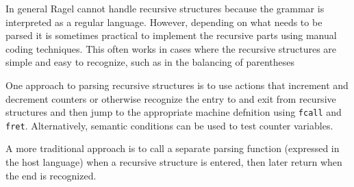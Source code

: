 \documentclass[letterpaper,11pt,oneside]{book}
\begin{document}
In general Ragel cannot handle recursive structures because the grammar is
interpreted as a regular language. However, depending on what needs to be
parsed it is sometimes practical to implement the recursive parts using manual
coding techniques. This often works in cases where the recursive structures are
simple and easy to recognize, such as in the balancing of parentheses

One approach to parsing recursive structures is to use actions that increment
and decrement counters or otherwise recognize the entry to and exit from
recursive structures and then jump to the appropriate machine defnition using
\verb|fcall| and \verb|fret|. Alternatively, semantic conditions can be used to
test counter variables.

A more traditional approach is to call a separate parsing function (expressed
in the host language) when a recursive structure is entered, then later return
when the end is recognized.
\end{document}
